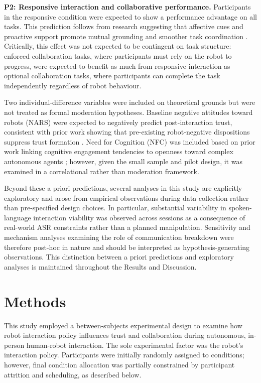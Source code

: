 \documentclass[
  authoryear,
  doubleblind,
  3p]{elsarticle}
\begin{document}
\textbf{P2: Responsive interaction and collaborative performance.}
Participants in the responsive condition were expected to show a
performance advantage on all tasks. This prediction follows from
research suggesting that affective cues and proactive support promote
mutual grounding and smoother task coordination
\citep{emaminejad2022, lin2022}. Critically, this effect was not
expected to be contingent on task structure: enforced collaboration
tasks, where participants must rely on the robot to progress, were
expected to benefit as much from responsive interaction as optional
collaboration tasks, where participants can complete the task
independently regardless of robot behaviour.

Two individual-difference variables were included on theoretical grounds
but were not treated as formal moderation hypotheses. Baseline negative
attitudes toward robots (NARS) were expected to negatively predict
post-interaction trust, consistent with prior work showing that
pre-existing robot-negative dispositions suppress trust formation
\citep{nomura, hancock2011}. Need for Cognition (NFC) was included based
on prior work linking cognitive engagement tendencies to openness toward
complex autonomous agents \citep{cacioppo1982}; however, given the small
sample and pilot design, it was examined in a correlational rather than
moderation framework.

Beyond these a priori predictions, several analyses in this study are
explicitly exploratory and arose from empirical observations during data
collection rather than pre-specified design choices. In particular,
substantial variability in spoken-language interaction viability was
observed across sessions as a consequence of real-world ASR constraints
rather than a planned manipulation. Sensitivity and mechanism analyses
examining the role of communication breakdown were therefore post-hoc in
nature and should be interpreted as hypothesis-generating observations.
This distinction between a priori predictions and exploratory analyses
is maintained throughout the Results and Discussion.

\section{Methods}\label{methods}

This study employed a between-subjects experimental design to examine
how robot interaction policy influences trust and collaboration during
autonomous, in-person human-robot interaction. The sole experimental
factor was the robot's interaction policy. Participants were initially
randomly assigned to conditions; however, final condition allocation was
partially constrained by participant attrition and scheduling, as
described below.
\end{document}
